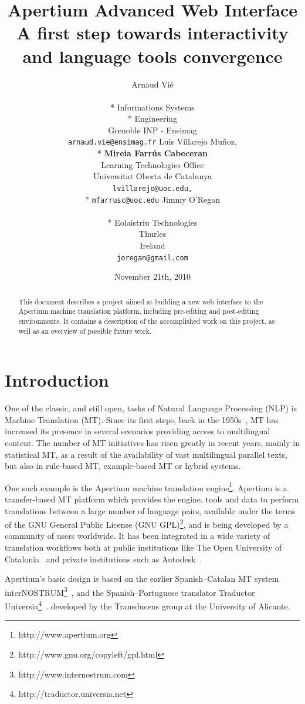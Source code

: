 \documentclass[11pt]{article}
\title{Apertium Advanced Web Interface \\ 
A first step towards interactivity and language tools convergence}
\author{
Arnaud Vié \\ 
\\*
Informations Systems \\* Engineering \\
Grenoble INP - Ensimag \\
{\tt arnaud.vie@ensimag.fr}
\And 
Luis Villarejo Muñoz, \\*
{\bf Mireia Farrús Cabeceran} \\
Learning Technologies Office \\
Universitat Oberta de Catalunya \\ 
{\tt lvillarejo@uoc.edu,} \\* 
{\tt mfarrusc@uoc.edu} 
\And
Jimmy O'Regan \\
\\*
Eolaistriu Technologies \\
Thurles \\
Ireland \\
{\tt joregan@gmail.com}
}
\date{November 21th, 2010}
\begin{document}
\maketitle

\begin{abstract}
This document describes a project aimed at building a new web interface 
to the Apertium machine translation platform, including pre-editing and 
post-editing environments. It contains a description of the accomplished 
work on this project, as well as an overview of possible future work.
\end{abstract}

\section{Introduction}
One of the classic, and still open, tasks of Natural Language Processing 
(NLP) is Machine Translation (MT). Since its first steps, back in the 
1950s~\citep{Hutchins92b}, MT has increased its presence in several 
scenarios providing access to multilingual content. The number of MT 
initiatives has risen greatly in recent years, mainly in statistical MT, as 
a result of the availability of vast multilingual parallel texts, but also 
in rule-based MT, example-based MT or hybrid systems. 

One such example is the Apertium machine translation 
engine\footnote{http://www.apertium.org}. Apertium is a transfer-based MT 
platform which provides the engine, tools and data to perform translations 
between a large number of language pairs, available under the terms of 
the GNU General Public 
License (GNU GPL)\footnote{http://www.gnu.org/copyleft/gpl.html}, and is being 
developed by a community of users worldwide. 
It has been integrated in a wide variety of translation workflows both 
at public institutions like The Open University of 
Catalonia~\citep{Villarejo:09} and private institutions such as
Autodesk~\citep{Masselot10}. 

Apertium's basic design is based on the 
earlier Spanish--Catalan MT system 
interNOSTRUM\footnote{http://www.internostrum.com}~\citep{canals01b},
and the Spanish--Portuguese translator Traductor
Universia\footnote{http://traductor.universia.net}~\citep{garrido04}.
developed by the Transducens group at the University of Alicante. 
\end{document}
